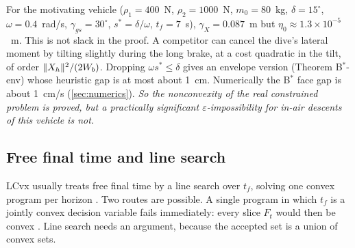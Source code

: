 \begin{remark}\label{rem:thin}
For the motivating vehicle ($\rho_1=400$~N, $\rho_2=1000$~N, $m_0=80$~kg, $\delta=15^\circ$, $\omega=0.4$~rad/s,
$\gamma_{gs}=30^\circ$, $s^*=\delta/\omega$, $t_f=7$~s), $\gamma_X=0.087$~m but $\eta_0\approx1.3\times10^{-5}$~m. This
is not slack in the proof. A competitor can cancel the dive's lateral moment by tilting slightly during the long
brake, at a cost quadratic in the tilt, of order $\lVert X_h\rVert^2/(2W_b)$. Dropping $\omega s^*\le\delta$ gives an envelope version
(Theorem B$^*$-env) whose heuristic gap is at most about 1~cm.
Numerically the B$^*$ face gap is about 1~cm/s (\cref{sec:numerics}). \emph{So the nonconvexity of the real constrained
problem is proved, but a practically significant $\varepsilon$-impossibility for in-air descents of this vehicle is not.}
\end{remark}

\subsection{Free final time and line search}\label{sec:freetf}
LCvx usually treats free final time by a line search over $t_f$, solving one convex program per horizon
\cite{blackmore2010jgcd,acikmese2013tcst}. Two routes are possible. A single program in which $t_f$ is a jointly
convex decision variable fails immediately: every slice $F_t$ would then be convex . Line
search needs an argument, because the accepted set is a union of convex sets.

